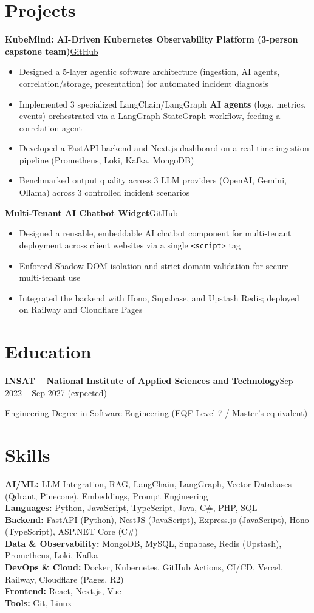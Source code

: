 \documentclass[10pt,a4paper]{article}
\newcommand{\entry}[2]{\vspace{1pt}\noindent\textbf{#1}\hfill{\color{muted}#2}\par}
\newcommand{\gh}[1]{\href{https://github.com/Hsan003/#1}{GitHub}}
\begin{document}
\section{Projects}
\entry{KubeMind: AI-Driven Kubernetes Observability Platform (3-person capstone team)}{\gh{kubemind}}
\begin{itemize}
  \item Designed a 5-layer agentic software architecture (ingestion, AI agents, correlation/storage, presentation) for automated incident diagnosis
  \item Implemented 3 specialized LangChain/LangGraph \textbf{AI agents} (logs, metrics, events) orchestrated via a LangGraph StateGraph workflow, feeding a correlation agent
  \item Developed a FastAPI backend and Next.js dashboard on a real-time ingestion pipeline (Prometheus, Loki, Kafka, MongoDB)
  \item Benchmarked output quality across 3 LLM providers (OpenAI, Gemini, Ollama) across 3 controlled incident scenarios
\end{itemize}
\entry{Multi-Tenant AI Chatbot Widget}{\gh{AI-Assistant-Backend}}
\begin{itemize}
  \item Designed a reusable, embeddable AI chatbot component for multi-tenant deployment across client websites via a single \texttt{<script>} tag
  \item Enforced Shadow DOM isolation and strict domain validation for secure multi-tenant use
  \item Integrated the backend with Hono, Supabase, and Upstash Redis; deployed on Railway and Cloudflare Pages
\end{itemize}

\section{Education}
\entry{INSAT -- National Institute of Applied Sciences and Technology}{Sep 2022 -- Sep 2027 (expected)}
Engineering Degree in Software Engineering (EQF Level 7 / Master's equivalent)

\section{Skills}
\textbf{AI/ML:} LLM Integration, RAG, LangChain, LangGraph, Vector Databases (Qdrant, Pinecone), Embeddings, Prompt Engineering\\
\textbf{Languages:} Python, JavaScript, TypeScript, Java, C\#, PHP, SQL\\
\textbf{Backend:} FastAPI (Python), NestJS (JavaScript), Express.js (JavaScript), Hono (TypeScript), ASP.NET Core (C\#)\\
\textbf{Data \& Observability:} MongoDB, MySQL, Supabase, Redis (Upstash), Prometheus, Loki, Kafka\\
\textbf{DevOps \& Cloud:} Docker, Kubernetes, GitHub Actions, CI/CD, Vercel, Railway, Cloudflare (Pages, R2)\\
\textbf{Frontend:} React, Next.js, Vue\\
\textbf{Tools:} Git, Linux
\end{document}
